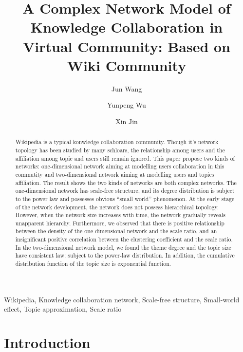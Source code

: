 \documentclass{elsarticle}
\begin{document}
\begin{frontmatter}
\title{A Complex Network Model of Knowledge Collaboration in Virtual Community: Based on Wiki Community
}
\author[buaa]{Jun Wang}

\author[buaa]{Yunpeng Wu}

\author[buaa]{Xin Jin}

\address[buaa]{School of Economics and Management, Beihang University, 
Beijing 100083, P.R. China}

\begin{abstract}
  Wikipedia is a typical konwledge collaboration community. Though
  it's network topology has been studied by many schloars, the
  relationship among users and the affiliation among topic and users 
  still remain ignored. This paper propose two kinds of networks:
one-dimensional network aiming at modelling users collaboration in
this commutity and
two-dimensional network aiming at modelling users and topics
affiliation. The result shows the two kinds of networks are both
complex networks.  The one-dimensional network has scale-free
structure, and its degree distribution is subject to the power law and
possesses obvious “small world” phenomenon. At the early stage of the
network development, the network does not possess hierarchical
topology. However, when the network size increases with time, the
network gradually reveals unapparent hierarchy. Furthermore, we
observed that there is positive relationship between the density of
the one-dimensional network and the scale ratio, and  an
insignificant positive correlation between the clustering coefficient
and the scale ratio. In the two-dimensional network model, we found
the theme degree and the topic size have consistent law: subject to
the power-law distribution. In addition, the cumulative distribution function of the topic size is exponential function.


\end{abstract}

\begin{keyword}
Wikipedia, Knowledge collaboration network, Scale-free structure,
Small-world effect, Topic approximation, Scale ratio
  
\end{keyword}
\end{frontmatter}

\section{Introduction}
\label{sec:introduction}
\end{document}
